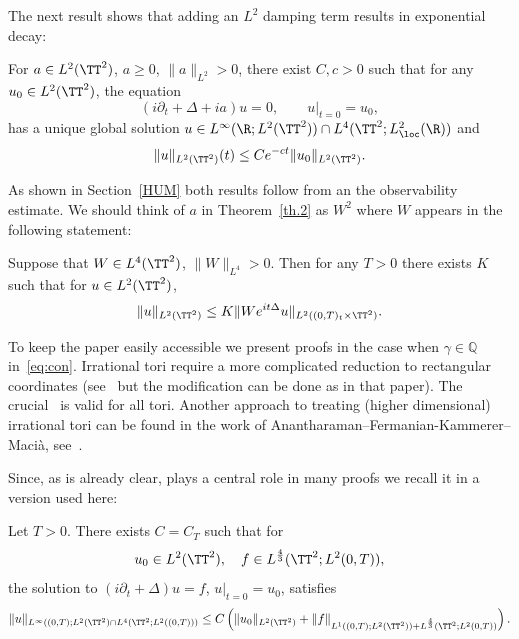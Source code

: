 The next result shows that adding an $ L^2 $ damping term results in exponential decay:

\begin{theo}\label{th.3}
For $a\in L^2(\TT^2)$, $ a \geq 0 $, $ \| a \|_{L^2} > 0$, there exist $C, c>0$ such that for any $u_0 \in L^2(\TT^2)$, the equation
\begin{equation}\label{damped}
(i \partial_t + \Delta + ia) u=0, \qquad u |_{t=0} = u_0,
\end{equation}
has a unique global solution $ u \in L^\infty(\R; L^2(\TT^2))\cap L^4(\TT^2; L^2_{\loc}(\R)) $ and
\begin{equation}\label{dampedbis}
\| u\|_{L^2(\TT^2)} (t) \leq C e^{-ct} \| u_0 \|_{L^2(\TT^2)}.
\end{equation}
\end{theo}

As shown in Section~\ref{HUM} both results follow from an the observability estimate. We should think of $ a $ in Theorem~\ref{th.2} as $ W^2 $ where $ W $ appears in the following statement:

\begin{theo}\label{th.1}
Suppose that $ W \in L^4 (\TT^2) $, $ \| W \|_{L^4} >0 $. Then for any $ T > 0$ there exists $ K $ such that for $ u \in L^2 (\TT^2) $,
\begin{equation}\label{eq:th1}
\| u \|_{ L^2 (\TT^2) } \leq K \| W e^{ it \Delta} u \|_{ L^2 ((0,T)_t \times \TT^2) }.
\end{equation}
\end{theo}

To keep the paper easily accessible we present proofs in the case when $ \gamma \in \mathbb Q $ in~\eqref{eq:con}. Irrational tori require a more complicated reduction to rectangular coordinates (see~\cite[Lemma~2.7 and Figure~1]{BZ4} but the modification can be done as in that paper). The crucial~\cite[Proposition~2.2]{BBZ} is valid for all tori. Another approach to treating (higher dimensional) irrational tori can be found in the work of Anantharaman--Fermanian-Kammerer--Macià, see~\cite[Corollary~1.19, Theorem~1.20]{AFM}.

Since, as is already clear, \cite[Proposition~2.2]{BBZ} plays a central role in many proofs we recall it in a version used here:

\begin{theo}\label{th.BBZ}
Let $ T > 0 $. There exists $ C = C_T $ such that for
\[
u_0\in L^2(\TT^2), \ \ \ f \in L^{\frac 4 3 } (\TT^2 ; L^2(0, T)),
\]
the solution to $ (i \partial_t + \Delta) u =f$, $ u|_{t=0} = u_0$, satisfies
\[
\| u\|_{L^\infty ((0, T) ; L^2 (\TT^2) \cap L^4(\TT^2; L^2((0,T)))}\\
\leq C \left(\|u_0\|_{L^2(\TT^2)} + \|f\|_{ L^1 ((0,T) ; L^2 (\TT^2)) + L^{\frac 4 3 } (\TT^2 ; L^2(0, T))}\right).
\]
\end{theo}

